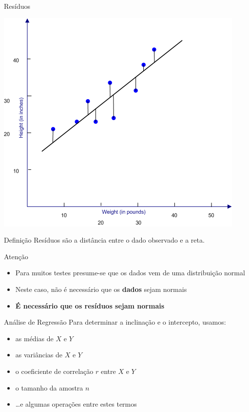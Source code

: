 \documentclass{beamer}
\begin{document}
\begin{frame}{\scriptsize Resíduos}
  \begin{center}
      \includegraphics[height=0.6\textheight]{Cap18-19/residuos}
  \end{center}

  \begin{block}{Definição}
    \footnotesize
    Resíduos são a distância entre o dado observado e a reta.
  \end{block}
\end{frame}

\begin{frame}{\scriptsize Atenção}
  \begin{itemize}
  \item Para muitos testes presume-se que os dados vem de uma distribuição normal
  \item Neste caso, não é necessário que os {\bf dados} sejam normais
  \item {\bf É necessário que os resíduos sejam normais}
  \end{itemize}
\end{frame}

\begin{frame}{\scriptsize Análise de Regressão}
  Para determinar a inclinação e o intercepto, usamos:
  \bigskip
  \begin{itemize}
    \scriptsize
  \item as médias de $X$ e $Y$
  \item as variâncias de $X$ e $Y$
  \item o coeficiente de correlação $r$ entre $X$ e $Y$
  \item o tamanho da amostra $n$
  \item \ldots e algumas operações entre estes termos
  \end{itemize}
\end{frame}
\end{document}

